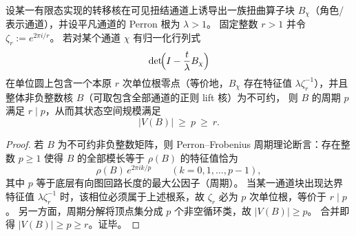 \begin{theorem}\label{thm:xi-cech-torsion-forces-period}
设某一有限态实现的转移核在可见扭结通道上诱导出一族扭曲算子块 \(B_\chi\)（角色/表示通道），并设平凡通道的 Perron 根为 \(\lambda>1\)。
固定整数 \(r>1\) 并令 \(\zeta_r:=e^{2\pi i/r}\)。
若对某个通道 \(\chi\) 有归一化行列式
\[
\det\!\Bigl(I-\frac{t}{\lambda}B_\chi\Bigr)
\]
在单位圆上包含一个本原 \(r\) 次单位根零点（等价地，\(B_\chi\) 存在特征值 \(\lambda\zeta_r^{-1}\)），并且整体非负整数核 \(B\)（可取包含全部通道的正则 lift 核）为不可约，
则 \(B\) 的周期 \(p\) 满足 \(r\mid p\)，从而其状态空间规模满足
\[
|V(B)|\ \ge\ p\ \ge\ r.
\]
\end{theorem}
\begin{proof}
若 \(B\) 为不可约非负整数矩阵，则 Perron--Frobenius 周期理论断言：存在整数 \(p\ge 1\) 使得 \(B\) 的全部模长等于 \(\rho(B)\) 的特征值恰为
\[
\rho(B)\,e^{2\pi i k/p}\qquad (k=0,1,\dots,p-1),
\]
其中 \(p\) 等于底层有向图回路长度的最大公因子（周期）。
当某一通道块出现达界特征值 \(\lambda\zeta_r^{-1}\) 时，该相位必须属于上述根系，故 \(\zeta_r\) 必为 \(p\) 次单位根，等价于 \(r\mid p\)。
另一方面，周期分解将顶点集分成 \(p\) 个非空循环类，故 \(|V(B)|\ge p\)。
合并即得 \(|V(B)|\ge p\ge r\)。证毕。
\end{proof}

\endinput
